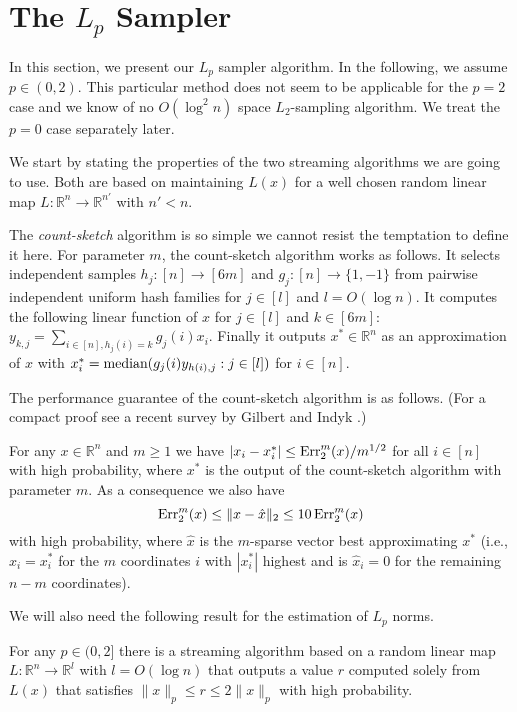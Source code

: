 \section{The $L_p$ Sampler}
\label{sec:lpsamp}
In this section, we present our $L_p$ sampler algorithm. In the following,
we assume  $p \in (0,2)$. This particular method does not seem to be
applicable for the $p=2$ case and we know of no $O(\log^2 n)$ space
$L_2$-sampling algorithm. We treat the $p=0$ case separately later.

We start by stating the properties of the two streaming algorithms we are
going to use. Both are based on maintaining $L(x)$
for a well chosen random linear map
$L:\mathbb R^n\to\mathbb R^{n'}$ with $n'<n$.

The {\em count-sketch} algorithm \cite{CharikarCF2004} is so simple we cannot resist the
temptation to define it here. For parameter $m$, the count-sketch algorithm
works as follows. It selects independent samples $h_j:[n]\to[6m]$ and
$g_j:[n]\to\{1,-1\}$ from pairwise independent uniform hash families for
$j\in[l]$ and $l=O(\log n)$. It computes the following linear function of $x$
for $j\in[l]$ and $k\in[6m]$:
$y_{k,j}=\sum_{i\in[n],h_j(i)=k}g_j(i)x_i$. Finally it outputs
$x^*\in\mathbb R^n$ as an approximation of $x$ with
$x^*_i=\hbox{median}(g_j(i)y_{h(i),j}:j\in[l])$ for $i\in[n]$.

The performance guarantee of the count-sketch algorithm is as follows.
(For a compact proof see a recent survey by Gilbert and Indyk \cite{GilbertI2010}.) 

\begin{lemma}
\label{c-s}
For any $x\in\mathbb R^n$ and $m\ge1$ we have
$|x_i-x^*_i|\le\operatorname{Err}_2^m(x)/m^{1/2}$
for all $i\in[n]$ with high probability,
where $x^*$ is the output of the count-sketch algorithm with parameter $m$.
As a consequence we also have
$$\operatorname{Err}_2^m(x)\le\|x-\hat x\|_2\le10\operatorname{Err}_2^m(x)$$
with high probability, where $\hat x$ is the
$m$-sparse vector best approximating $x^*$ (i.e., $\hat x_i=x^*_i$ for the
$m$ coordinates $i$ with $|x^*_i|$ highest and is $\hat x_i=0$ for the
remaining $n-m$ coordinates).
\end{lemma}

We will also need the following result for the estimation of $L_p$ norms.

\begin{lemma}
\label{norm}
For any $p\in(0,2]$ there is a streaming algorithm based on a random linear
map $L:\mathbb R^n\to\mathbb R^l$ with $l=O(\log n)$ that outputs a value $r$
computed solely from $L(x)$ that satisfies
$\|x\|_p\le r\le2\|x\|_p$
with high probability.
\end{lemma}

